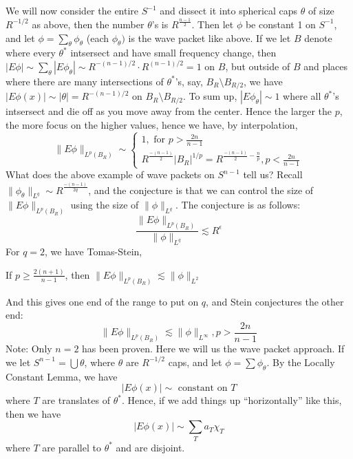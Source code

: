 We will now consider the entire $S^{-1}$ and dissect it into spherical caps $\theta$ of size $R^{-1/2}$ as above, then the number $\theta$'s is $R^{\frac{n-1}{2}}$. Then let $\phi$ be constant 1 on $S^{-1}$, and let $\phi=\sum_\theta\phi_\theta$ (each $\phi_\theta)$ is the wave packet like above. If we let $B$ denote where every $\theta^*$ intsersect and have small frequency change, then $|E\phi|\sim\sum_\theta|E\phi_\theta|\sim R^{-(n-1)/2}\cdot R^{(n-1)/2}=1$ on $B$, but outside of $B$ and places where there are many intersections of $\theta^*$'s, say, $B_R\setminus B_{R/2}$, we have $|E\phi(x)|\sim|\theta|=R^{-(n-1)/2}$ on $B_R\setminus B_{R/2}$. To sum up, $|E\phi_\theta|\sim 1$ where all $\theta^*$'s intsersect and die off as you move away from the center. Hence the larger the $p$, the more focus on the higher values, hence we have, by interpolation,
\begin{equation*}
    \|E\phi\|_{L^p(B_R)}\sim\begin{cases}
        1, \text{ for } p>\frac{2n}{n-1}\\
        R^{\frac{-(n-1)}{2}}|B_R|^{1/p}=R^{\frac{-(n-1)}{2}-\frac{n}{p}}, p<\frac{2n}{n-1}
    \end{cases}
\end{equation*}
What does the above example of wave packets on $S^{n-1}$ tell us? Recall $\|\phi_\theta\|_{L^q}\sim R^{\frac{-(n-1)}{2q}}$, and the conjecture is that we can control the size of $\|E\phi\|_{L^p(B_R)}$ using the size of $\|\phi\|_{L^q}$. The conjecture is as follows:
\begin{equation*}
    \frac{\|E\phi\|_{L^p(B_R)}}{\|\phi\|_{L^q}}\lesssim R^\epsilon
\end{equation*}
For $q=2$, we have Tomas-Stein,
\begin{theorem}
    If $p\geq\frac{2(n+1)}{n-1}$, then $\|E\phi\|_{L^p(B_R)}\lesssim \|\phi\|_{L^2}$
\end{theorem}
And this gives one end of the range to put on $q$, and Stein conjectures the other end:
\begin{equation*}
    \|E\phi\|_{L^p(B_R)}\lesssim \|\phi\|_{L^\infty}, p>\frac{2n}{n-1}
\end{equation*}
Note: Only $n=2$ has been proven. Here we will us the wave packet approach. If we let $S^{n-1}=\bigcup\theta$, where $\theta$ are $R^{-1/2}$ caps, and let $\phi=\sum\phi_\theta$. By the Locally Constant Lemma, we have
\begin{equation*}
    |E\phi(x)|\sim \text{ constant on } T
\end{equation*}
where $T$ are translates of $\theta^*$. Hence, if we add things up ``horizontally'' like this, then we have
\begin{equation*}
    |E\phi(x)|\sim\sum_T a_T\chi_T
\end{equation*}
where $T$ are parallel to $\theta^*$ and are disjoint.

